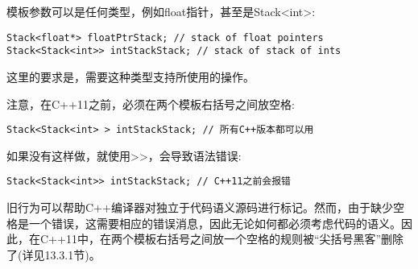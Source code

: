 模板参数可以是任何类型，例如float指针，甚至是Stack<int>:

\begin{lstlisting}[style=styleCXX]
Stack<float*> floatPtrStack; // stack of float pointers
Stack<Stack<int>> intStackStack; // stack of stack of ints
\end{lstlisting}

这里的要求是，需要这种类型支持所使用的操作。

注意，在C++11之前，必须在两个模板右括号之间放空格:

\begin{lstlisting}[style=styleCXX]
Stack<Stack<int> > intStackStack; // 所有C++版本都可以用
\end{lstlisting}

如果没有这样做，就使用>{}>，会导致语法错误:

\begin{lstlisting}[style=styleCXX]
Stack<Stack<int>> intStackStack; // C++11之前会报错
\end{lstlisting}

旧行为可以帮助C++编译器对独立于代码语义源码进行标记。然而，由于缺少空格是一个错误，这需要相应的错误消息，因此无论如何都必须考虑代码的语义。因此，在C++11中，在两个模板右括号之间放一个空格的规则被“尖括号黑客”删除了(详见13.3.1节)。





















